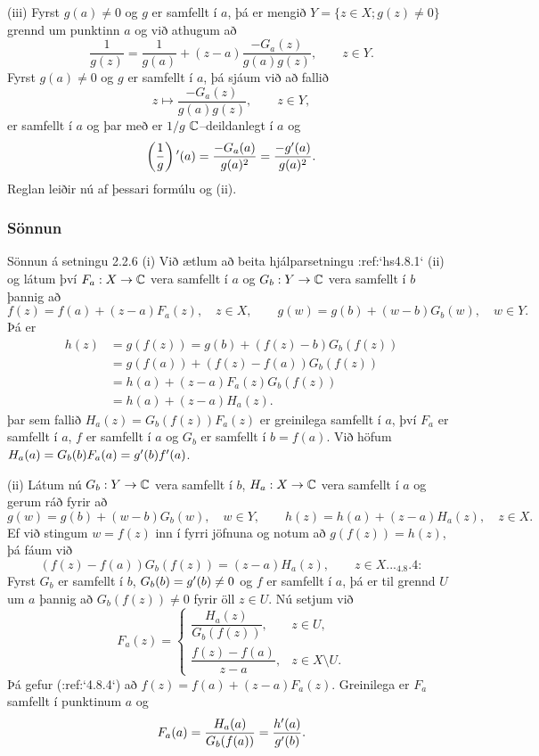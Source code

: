 (iii)  Fyrst $g(a)\neq 0$ og $g$ er samfellt í $a$, þá er 
mengið $Y=\{z\in X; g(z)\neq 0\}$ grennd um punktinn $a$
og við athugum að 
 $$\dfrac 1{g(z)} =\dfrac 1{g(a)}+(z-a)\dfrac {-G_a(z)}{g(a)g(z)}, \qquad
z\in Y.  
 $$
Fyrst $g(a)\neq 0$ og $g$ er samfellt í $a$, þá 
sjáum við að fallið
 $$z\mapsto \dfrac {-G_a(z)}{g(a)g(z)}, \qquad z\in Y,
 $$
er samfellt í $a$ og þar með er $1/g$ ${\mathbb C}$--deildanlegt í $a$ og
 $$\left(\dfrac 1g\right){\sp{\prime}}(a)= \dfrac{-G_a(a)}{g(a)^2} =
\dfrac {-g{\sp{\prime}}(a)}{g(a)\sp 2}.
 $$
Reglan leiðir nú af þessari formúlu og (ii).



\subsubsection{Sönnun}{Sönnun á setningu 2.2.6} (i)  
Við ætlum að beita hjálparsetningu :ref:`hs4.8.1` (ii) og 
látum því $F_a:X\to {\mathbb C}$ vera samfellt í $a$ og $G_b:Y\to {\mathbb C}$ vera
samfellt í $b$ þannig að 
 $$f(z)=f(a)+(z-a)F_a(z), \quad z\in X, \qquad g(w)=g(b)+(w-b)G_b(w), \quad
w\in Y. 
 $$
Þá er
\begin{align*}
h(z)&=g(f(z))=g(b)+(f(z)-b)G_b(f(z))\\
&=g(f(a))+(f(z)-f(a))G_b(f(z))\\
&=h(a)+(z-a)F_a(z)G_b(f(z))\\
&=h(a)+(z-a)H_a(z).
\end{align*}
þar sem fallið $H_a(z)=G_b(f(z))F_a(z)$ er greinilega samfellt í $a$, því
$F_a$ er samfellt í $a$, $f$ er samfellt í $a$  og $G_b$ er samfellt í
$b=f(a)$.  Við höfum $H_a(a)=G_b(b)F_a(a)=g{\sp{\prime}}(b)f{\sp{\prime}}(a)$. 


(ii)  Látum nú $G_b:Y\to {\mathbb C}$ vera samfellt í $b$,  $H_a:X\to {\mathbb C}$ vera
samfellt í $a$ og gerum ráð fyrir að
 $$g(w)=g(b)+(w-b)G_b(w), \quad
w\in Y, \qquad h(z)=h(a)+(z-a)H_a(z), \quad z\in X. 
 $$
Ef við stingum $w=f(z)$ inn í fyrri jöfnuna og notum að
$g(f(z))=h(z)$, þá fáum við 
 \begin{equation*}(f(z)-f(a))G_b(f(z))=(z-a)H_a(z),\qquad z\in X. 

.. _4.8.4:

 \end{equation*}
Fyrst $G_b$ er samfellt í $b$, $G_b(b)=g{\sp{\prime}}(b)\neq 0$ og $f$ er
samfellt í $a$,  þá er til
grennd $U$ um $a$ þannig að $G_b(f(z))\neq 0$ fyrir öll $z\in U$.  Nú
setjum við 
 $$F_a(z)=\begin{cases}
\dfrac{H_a(z)}{G_b(f(z))}, &z\in U,\\
\dfrac{f(z)-f(a)}{z-a}, &z\in X\setminus U.
\end{cases}
 $$
Þá gefur (:ref:`4.8.4`) að $f(z)=f(a)+(z-a)F_a(z)$.  Greinilega er $F_a$
samfellt í punktinum $a$ og
 $$F_a(a)=\dfrac{H_a(a)}{G_b(f(a))}=\dfrac{h{\sp{\prime}}(a)}{g{\sp{\prime}}(b)}.
 $$
 


